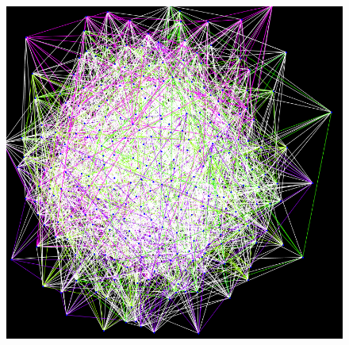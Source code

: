 \begin{figure}
\centering \includegraphics[scale=0.5]{uuf030.png}
\caption{}\label{}
\end{figure}



